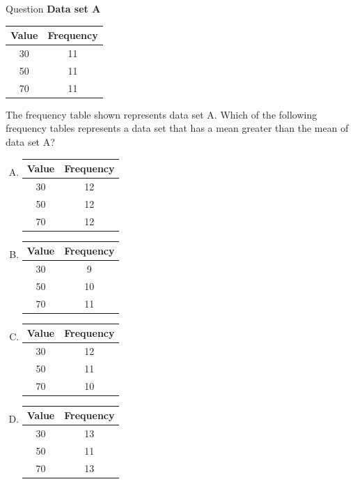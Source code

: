 \documentclass{beamer}
\begin{document}
\begin{frame}{Question}
\tiny
\textbf{Data set A}
\begin{center}
\begin{tabular}{|c|c|}
\hline
\textbf{Value} & \textbf{Frequency} \\
\hline
30 & 11 \\
50 & 11 \\
70 & 11 \\
\hline
\end{tabular}
\end{center}

The frequency table shown represents data set A. Which of the following frequency tables represents a data set that has a mean greater than the mean of data set A?

\begin{enumerate}[A.]
    \item 
    \begin{tabular}{|c|c|}
    \hline
    \textbf{Value} & \textbf{Frequency} \\
    \hline
    30 & 12 \\
    50 & 12 \\
    70 & 12 \\
    \hline
    \end{tabular}

    \item 
    \begin{tabular}{|c|c|}
    \hline
    \textbf{Value} & \textbf{Frequency} \\
    \hline
    30 & 9 \\
    50 & 10 \\
    70 & 11 \\
    \hline
    \end{tabular}

    \item 
    \begin{tabular}{|c|c|}
    \hline
    \textbf{Value} & \textbf{Frequency} \\
    \hline
    30 & 12 \\
    50 & 11 \\
    70 & 10 \\
    \hline
    \end{tabular}

    \item 
    \begin{tabular}{|c|c|}
    \hline
    \textbf{Value} & \textbf{Frequency} \\
    \hline
    30 & 13 \\
    50 & 11 \\
    70 & 13 \\
    \hline
    \end{tabular}
\end{enumerate}
\end{frame}
\end{document}
